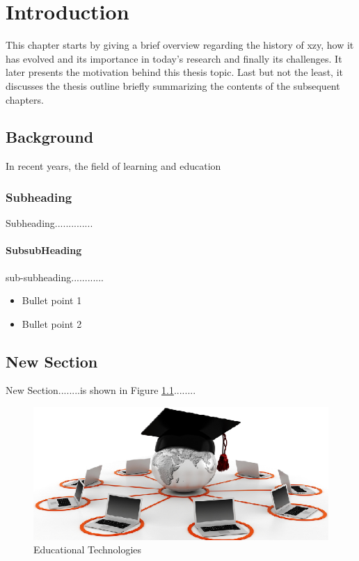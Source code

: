 \chapter{Introduction}
\label{cha:introduction}


This chapter starts by giving a brief overview regarding the history of xzy, how it has evolved and its importance in today's research and finally its challenges. It later presents the motivation behind this thesis topic. Last but not the least, it discusses the thesis outline briefly summarizing the contents of the subsequent chapters.

\section{Background}

In recent years, the field of learning and education

\subsection{Subheading}

Subheading..............

\subsubsection{SubsubHeading}

sub-subheading............


\begin{itemize}
	\item{Bullet point 1}
	\item {Bullet point 2}
\end{itemize}


\section{New Section}

New Section........is shown in Figure \ref{fig:eduTec}........

\begin{figure}[h]
	\centering
	\includegraphics[width=1\textwidth]{images/eduTec.png}
	\caption{Educational Technologies \cite{google}}
	\label{fig:eduTec} 
\end{figure}
\FloatBarrier

